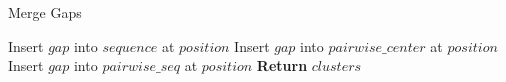 \begin{algorithm}[H]
\caption{Merge Gaps}
\begin{algorithmic}[1]
            \State Insert $gap$ into $sequence$ at $position$
        \EndFor
        \State Insert $gap$ into $pairwise\_center$ at $position$
        \State Insert $gap$ into $pairwise\_seq$ at $position$
    \EndIf
\EndFor
\State \textbf{Return} $clusters$
\end{algorithmic}
\end{algorithm}
